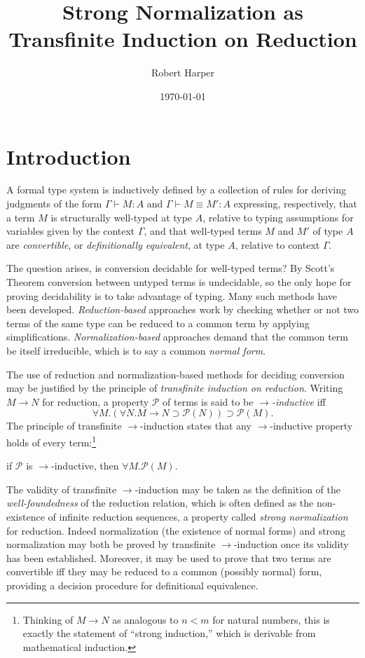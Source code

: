 \documentclass[11pt,twoside]{article}
\begin{document}
\title{Strong Normalization as Transfinite Induction on Reduction}
\author{Robert Harper}
\date{\today}

\maketitle{}

\section{Introduction}

A formal type system is inductively defined by a collection of rules for deriving
judgments of the form $\Gamma\vdash M:A$ and $\Gamma\vdash M\equiv M':A$ expressing, respectively, that a term
$M$ is structurally well-typed at type $A$, relative to typing assumptions for variables
given by the context $\Gamma$, and that well-typed terms $M$ and $M'$ of type $A$ are
\emph{convertible}, or \emph{definitionally equivalent}, at type $A$, relative to context
$\Gamma$.

The question arises, is conversion decidable for well-typed terms?  By Scott's Theorem
conversion between untyped terms is undecidable, so the only hope for proving decidability
is to take advantage of typing.  Many such methods have been developed.
\emph{Reduction-based} approaches work by checking whether or not two terms of the same
type can be reduced to a common term by applying simplifications.
\emph{Normalization-based} approaches demand that the common term be itself irreducible,
which is to say a common \emph{normal form}.

The use of reduction and normalization-based methods for deciding conversion may be
justified by the principle of \emph{transfinite induction on reduction}.  Writing $M\to N$
for reduction, a property $\mathcal{P}$ of terms is said to be \emph{$\to$-inductive} iff
\begin{displaymath}
  \forall M.(\forall N.M\to N\supset\mathcal{P}(N))\supset\mathcal{P}(M).
\end{displaymath}
The principle of transfinite $\to$-induction states that any $\to$-inductive property holds of
every term:\footnote{Thinking of $M\to N$ as analogous to $n<m$ for natural numbers, this
  is exactly the statement of ``strong induction,'' which is derivable from mathematical
  induction.}
\begin{center}
  if $\mathcal{P}$ is $\to$-inductive, then $\forall M.\mathcal{P}(M)$.
\end{center}
The validity of transfinite $\to$-induction may be taken as the definition of the
\emph{well-foundedness} of the reduction relation, which is often defined as the
non-existence of infinite reduction sequences, a property called \emph{strong
  normalization} for reduction.  Indeed normalization (the existence of normal forms) and
strong normalization may both be proved by transfinite $\to$-induction once its validity has
been established.  Moreover, it may be used to prove that two terms are convertible iff
they may be reduced to a common (possibly normal) form, providing a decision procedure for
definitional equivalence.
\end{document}

